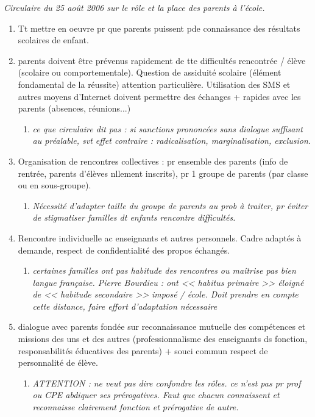 \documentclass[12pt]{report}
\begin{document}
\begin{itemize}
{\begin{minipage}{19cm}
\textit{Circulaire du 25 août 2006 sur le rôle et la place des parents à l'école.}

\begin{enumerate}
\item Tt mettre en oeuvre pr que parents puissent pde connaissance des résultats scolaires de enfant.\\

\item parents doivent être prévenus rapidement de tte difficultés rencontrée / élève (scolaire ou comportementale). Question de assiduité scolaire (élément fondamental de la réussite) attention particulière. Utilisation des SMS et autres moyens d'Internet doivent permettre des échanges + rapides avec les parents (absences, réunions...)
\begin{enumerate}
\item \textit{ce que circulaire dit pas : si sanctions prononcées sans dialogue suffisant au préalable, svt effet contraire : radicalisation, marginalisation, exclusion}.
\end{enumerate}

\item Organisation de rencontres collectives : pr ensemble des parents (info de rentrée, parents d'élèves nllement inscrits), pr 1 groupe de parents (par classe ou en sous-groupe).\\
\begin{enumerate}
\item \textit{Nécessité d'adapter taille du groupe de parents au prob à traiter, pr éviter de stigmatiser familles dt enfants rencontre difficultés.}
\end{enumerate}

\item Rencontre individuelle ac enseignants et autres personnels. Cadre adaptés à demande, respect de confidentialité des propos échangés. \\
\begin{enumerate}
\item \textit{certaines familles ont pas habitude des rencontres ou maîtrise pas bien langue française. Pierre Bourdieu : ont << habitus primaire >> éloigné de << habitude secondaire >> imposé / école. Doit prendre en compte cette distance, faire effort d'adaptation nécessaire}  \\
\end{enumerate}

\item dialogue avec parents fondée sur reconnaissance mutuelle des compétences et missions des uns et des autres (professionnalisme des enseignants ds fonction, responsabilités éducatives des parents) + souci commun respect de personnalité de élève.\\
\begin{enumerate}
\item \textit{ATTENTION : ne veut pas dire confondre les rôles. ce n'est pas pr prof ou CPE abdiquer ses prérogatives. Faut que chacun connaissent et reconnaisse clairement fonction et prérogative de autre.} \\
\end{enumerate}


\end{enumerate}
\end{minipage}}
\end{itemize}
\end{document}
